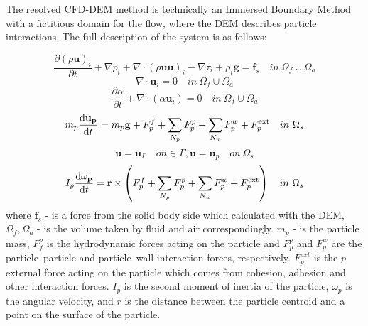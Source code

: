 The resolved CFD-DEM method is technically an Immersed Boundary Method with a fictitious domain for the flow, where the DEM describes particle interactions. The full description of the system is as follows:

\begin{equation}
    \frac{\partial (\rho \mathbf{u})_i}{\partial t} + \nabla p_i  +  \nabla \cdot(\rho \mathbf{u}\mathbf{u})_i - \nabla \tau_i + \rho_i \mathbf{g} = \mathbf{f}_{s} \quad in ~\Omega_f \cup \Omega_a
\end{equation}
\begin{equation}
    \nabla\cdot \mathbf{u}_i = 0 \quad in ~\Omega_f \cup \Omega_a
\end{equation}
\begin{equation}
    \frac{\partial \alpha}{\partial t} + \nabla\cdot(\alpha\mathbf{u}_i) = 0 \quad in ~\Omega_f \cup \Omega_a
\end{equation}
\begin{equation}
    m_{p} \frac{\mathrm{d} \mathbf{u}_{\mathbf{p}}}{\mathrm{d} t}=m_{p} \mathbf{g}+F_{p}^{f}+\sum_{N_{p}} F_{p}^{p}+\sum_{N_{w}} F_{p}^{w}+F_{p}^{\mathrm{ext}} \\ \quad in ~\Omega_s
\end{equation}
\begin{equation}
    \mathbf{u} = \mathbf{u}_{\Gamma} \quad on \in \Gamma, \mathbf{u} = \mathbf{u}_p \quad on ~\Omega_s
\end{equation}
\begin{equation}
I_{p} \frac{\mathrm{d} \omega_{\mathbf{p}}}{\mathrm{d} t}=\mathbf{r} \times\left(F_{p}^{f}+\sum_{N_{p}} F_{p}^{p}+\sum_{N_{w}} F_{p}^{w}+F_{p}^{\mathrm{ext}}\right)\\ \quad in ~\Omega_s
\end{equation}
where  $\mathbf{f}_{s}$ - is a force from the solid body side which calculated with the DEM, $\Omega_f,\Omega_a$ -  is the volume taken by fluid and air correspondingly. $m_p$ - is the particle mass, $F^p_f$ is the hydrodynamic forces acting on the particle and $F^p_p$ and $F^w_p$ are the particle–particle and particle–wall interaction forces, respectively. $F^{ext}_p$ is the $p$ external force acting on the particle which comes from cohesion, adhesion and other interaction forces. $I_p$ is the second moment of inertia of the particle, ${\omega}_p$ is the angular velocity, and $r$ is the distance between the particle centroid and a point on the surface of the particle. 


